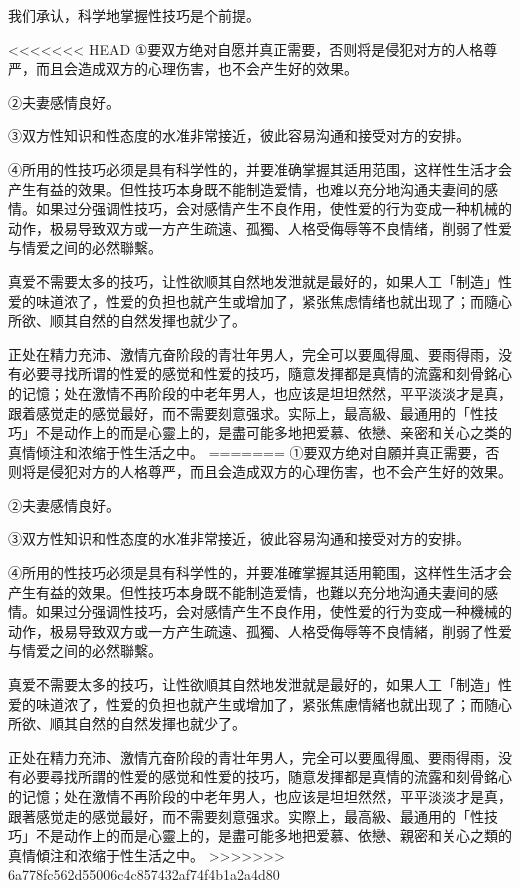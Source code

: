 \documentclass[12pt,UTF8]{ctexbook}
\begin{document}
我们承认，科学地掌握性技巧是个前提。

<<<<<<< HEAD
①要双方绝对自愿并真正需要，否则将是侵犯对方的人格尊严，而且会造成双方的心理伤害，也不会产生好的效果。

②夫妻感情良好。

③双方性知识和性态度的水准非常接近，彼此容易沟通和接受对方的安排。

④所用的性技巧必须是具有科学性的，并要准确掌握其适用范围，这样性生活才会产生有益的效果。但性技巧本身既不能制造爱情，也难以充分地沟通夫妻间的感情。如果过分强调性技巧，会对感情产生不良作用，使性爱的行为变成一种机械的动作，极易导致双方或一方产生疏遠、孤獨、人格受侮辱等不良情绪，削弱了性爱与情爱之间的必然聯繫。

真爱不需要太多的技巧，让性欲顺其自然地发泄就是最好的，如果人工「制造」性爱的味道浓了，性爱的负担也就产生或增加了，紧张焦虑情绪也就出现了；而隨心所欲、顺其自然的自然发揮也就少了。

正处在精力充沛、激情亢奋阶段的青壮年男人，完全可以要風得風、要雨得雨，没有必要寻找所谓的性爱的感觉和性爱的技巧，隨意发揮都是真情的流露和刻骨銘心的记憶；处在激情不再阶段的中老年男人，也应该是坦坦然然，平平淡淡才是真，跟着感觉走的感觉最好，而不需要刻意强求。实际上，最高級、最通用的「性技巧」不是动作上的而是心靈上的，是盡可能多地把爱慕、依戀、亲密和关心之类的真情倾注和浓缩于性生活之中。
=======
①要双方绝对自願并真正需要，否则将是侵犯对方的人格尊严，而且会造成双方的心理伤害，也不会产生好的效果。

②夫妻感情良好。

③双方性知识和性态度的水准非常接近，彼此容易沟通和接受对方的安排。

④所用的性技巧必须是具有科学性的，并要准確掌握其适用範围，这样性生活才会产生有益的效果。但性技巧本身既不能制造爱情，也難以充分地沟通夫妻间的感情。如果过分强调性技巧，会对感情产生不良作用，使性爱的行为变成一种機械的动作，极易导致双方或一方产生疏遠、孤獨、人格受侮辱等不良情緒，削弱了性爱与情爱之间的必然聯繫。

真爱不需要太多的技巧，让性欲順其自然地发泄就是最好的，如果人工「制造」性爱的味道浓了，性爱的负担也就产生或增加了，紧张焦慮情緒也就出现了；而随心所欲、順其自然的自然发揮也就少了。

正处在精力充沛、激情亢奋阶段的青壮年男人，完全可以要風得風、要雨得雨，没有必要尋找所謂的性爱的感觉和性爱的技巧，随意发揮都是真情的流露和刻骨銘心的记憶；处在激情不再阶段的中老年男人，也应该是坦坦然然，平平淡淡才是真，跟著感觉走的感觉最好，而不需要刻意强求。实際上，最高級、最通用的「性技巧」不是动作上的而是心靈上的，是盡可能多地把爱慕、依戀、親密和关心之類的真情傾注和浓缩于性生活之中。
>>>>>>> 6a778fc562d55006c4c857432af74f4b1a2a4d80
\end{document}
